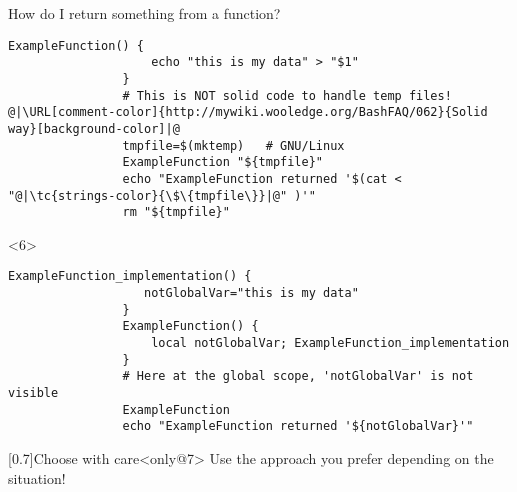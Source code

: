 \begin{frame}[fragile]{How do I return something from a function?}
\begin{overlayarea}{\textwidth}{0.7\textheight}
\begin{onlyenv}
            \begin{lstlisting}[style=MyBash, numbers=none]
                ExampleFunction() {
                    echo "this is my data" > "$1"
                }
                # This is NOT solid code to handle temp files! @|\URL[comment-color]{http://mywiki.wooledge.org/BashFAQ/062}{Solid way}[background-color]|@
                tmpfile=$(mktemp)   # GNU/Linux
                ExampleFunction "${tmpfile}"
                echo "ExampleFunction returned '$(cat < "@|\tc{strings-color}{\$\{tmpfile\}}|@" )'"
                rm "${tmpfile}"
            \end{lstlisting}
        \end{onlyenv}
        \begin{onlyenv}<6>
            \begin{lstlisting}[style=MyBash, numbers=none, emph={[7]notGlobalVar},]
                ExampleFunction_implementation() {
                   notGlobalVar="this is my data"
                }
                ExampleFunction() {
                    local notGlobalVar; ExampleFunction_implementation
                }
                # Here at the global scope, 'notGlobalVar' is not visible
                ExampleFunction
                echo "ExampleFunction returned '${notGlobalVar}'"
            \end{lstlisting}
        \end{onlyenv}
        \vspace{-3mm}
        \begin{varblock}{}[0.7\textwidth]{Choose with care}<only@7>
            Use the approach you prefer depending on the situation!
        \end{varblock}
    \end{overlayarea}
\end{frame}

